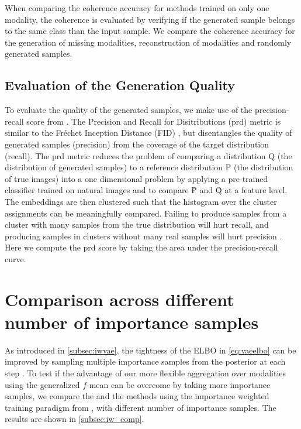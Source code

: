 When comparing the coherence accuracy for methods trained on only one modality, the coherence is evaluated by verifying if the generated sample belongs to the same class than the input sample.
We compare the coherence accuracy for the generation of missing modalities, reconstruction of modalities and randomly generated samples.

\subsection{Evaluation of the Generation Quality}
\label{subsubsec:gen_qual}
To evaluate the quality of the generated samples, we make use of the precision-recall score from \citep{precision_recall_distributions}.
The Precision and Recall for Disitributions (prd) metric is similar to the Fréchet Inception Distance (FID) \citep{heusel_gans_2017}, but disentangles the quality of generated samples (precision) from the coverage of the target distribution (recall).
The prd metric reduces the problem of comparing a distribution Q (the distribution of generated samples) to a reference distribution P (the distribution of true images) into a one dimensional problem by applying a pre-trained classifier trained on natural images and to compare \^{P} and \^{Q} at a feature level.
The embeddings are then clustered such that the histogram over the cluster assignments can be meaningfully compared.
Failing to produce samples from a cluster with many samples from the true distribution will hurt recall, and producing samples in clusters without many real samples will hurt precision \citep{precision_recall_distributions}.
Here we compute the prd score by taking the area under the precision-recall curve.



\section{Comparison across different number of importance samples}
As introduced in \cref{subsec:iwvae}, the tightness of the ELBO in \cref{eq:vaeelbo} can be improved by sampling multiple importance samples from the posterior at each step \parencite{burda_importance_2016}.
To test if the advantage of our more flexible aggregation over modalities using the generalized $f$-mean can be overcome by taking more importance samples, we compare the  and the  methods using the importance weighted training paradigm from \parencite{burda_importance_2016}, with different number of importance samples.
The results are shown in \cref{subsec:iw_comp}.

